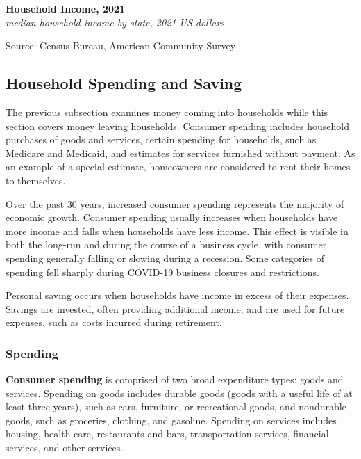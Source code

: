 \documentclass{report}
\newcommand{\tbllink}[1]{\href{https://raw.githubusercontent.com/bdecon/US-chartbook/master/chartbook/data/#1}{\faTable}}
\begin{document}
{\normalsize \textbf{Household Income, 2021}\\
\footnotesize{\textit{median household income by state, 2021 US dollars}}
\vspace{-3mm}

\hspace{-5mm} 
\vspace{-6mm}

\begin{minipage}{0.76\textwidth} 
\footnotesize{Source: Census Bureau, American Community Survey} \hfill \tbllink{median_hh_inc_state.csv}
\end{minipage}
\newpage 
\begin{minipage}{0.76\textwidth}  
\subsection*{Household Spending and Saving}
\hypertarget{hhss}{\label{hhss}} 
\small The previous subsection examines money coming into households while this section covers money leaving households. \href{https://www.bea.gov/data/consumer-spending/main}{Consumer spending} includes household purchases of goods and services, certain spending for households, such as Medicare and Medicaid, and estimates for services furnished without payment. As an example of a special estimate, homeowners are considered to rent their homes to themselves. 

Over the past 30 years, increased consumer spending represents the majority of economic growth. Consumer spending usually increases when households have more income and falls when households have less income. This effect is visible in both the long-run and during the course of a business cycle, with consumer spending generally falling or slowing during a recession. Some categories of spending fell sharply during COVID-19 business closures and restrictions.

\href{https://www.bea.gov/data/income-saving/personal-saving-rate}{Personal saving} occurs when households have income in excess of their expenses. Savings are invested, often providing additional income, and are used for future expenses, such as costs incurred during retirement.

\subsubsection*{Spending}
\small \textbf{Consumer spending} is comprised of two broad expenditure types: goods and services. Spending on goods includes durable goods (goods with a useful life of at least three years), such as cars, furniture, or recreational goods, and nondurable goods, such as groceries, clothing, and gasoline. Spending on services includes housing, health care, restaurants and bars, transportation services, financial services, and other services. 
\end{minipage}
\vspace{2mm}

}
\end{document}
